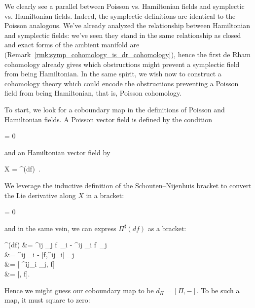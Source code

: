 
We clearly see a parallel between Poisson vs. Hamiltonian fields and symplectic vs. Hamiltonian fields. Indeed, the symplectic definitions are identical to the Poisson analogous. We've already analyzed the relationship between Hamiltonian and symplectic fields: we've seen they stand in the same relationship as closed and exact forms of the ambient manifold are (Remark~\ref{rmk:symp_cohomology_is_dr_cohomology}), hence the first de Rham cohomology already gives which obstructions might prevent a symplectic field from being Hamiltonian. In the same spirit, we wish now to construct a cohomology theory which could encode the obstructions preventing a Poisson field from being Hamiltonian, that is, Poisson cohomology.

To start, we look for a coboundary map in the definitions of Poisson and Hamiltonian fields. A Poisson vector field is defined by the condition
\begin{eqalign}
	\Pi = 0
\end{eqalign}
and an Hamiltonian vector field by
\begin{eqalign}
	X = \Pi^\sharp(df)\ .
\end{eqalign}
We leverage the inductive definition of the Schouten--Nijenhuis bracket to convert the Lie derivative along $X$ in a bracket:
\begin{eqalign}
	[\Pi, X] = 0
\end{eqalign}
and in the same vein, we can express $\Pi^\sharp(df)$ as a bracket:
\begin{eqalign}
	\Pi^\sharp(df) &=  \Pi^{ij} \partial_j f\, \partial_i -  \Pi^{ij} \partial_i f\, \partial_j\\
		&=  \Pi^{ij} \partial_i \wedge [f, \partial_j] -  [f,\Pi^{ij}\partial_i] \wedge \partial_j\\
		&= [ \Pi^{ij}\partial_i \wedge \partial_j, f]\\
		&= [\Pi, f].
\end{eqalign}
Hence we might guess our coboundary map to be $d_\Pi = [\Pi, -]$. To be such a map, it must square to zero:

